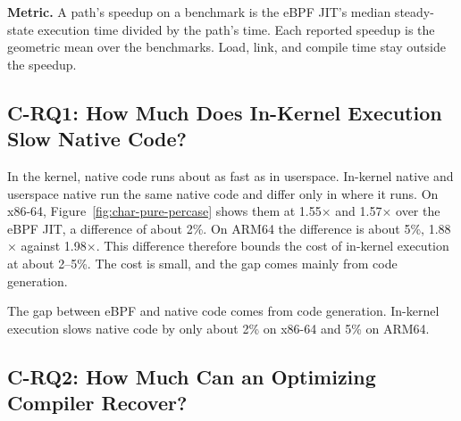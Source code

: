 \noindent\textbf{Metric.}
A path's speedup on a benchmark is the eBPF JIT's median steady-state execution time divided by the path's time.
Each reported speedup is the geometric mean over the benchmarks.
Load, link, and compile time stay outside the speedup.

% 


\subsection{C-RQ1: How Much Does In-Kernel Execution Slow Native Code?}
\label{subsec:gap}

In the kernel, native code runs about as fast as in userspace.
In-kernel native and userspace native run the same native code and differ only in where it runs.
On x86-64, Figure~\ref{fig:char-pure-percase} shows them at 1.55$\times$ and 1.57$\times$ over the eBPF JIT, a difference of about 2\%. On ARM64 the difference is about 5\%, 1.88$\times$ against 1.98$\times$.
This difference therefore bounds the cost of in-kernel execution at about 2--5\%.
The cost is small, and the gap comes mainly from code generation.

\begin{finding}
\finlabel The gap between eBPF and native code comes from code generation. In-kernel execution slows native code by only about 2\% on x86-64 and 5\% on ARM64.
\end{finding}



\subsection{C-RQ2: How Much Can an Optimizing Compiler Recover?}
\label{subsec:char-jit}

